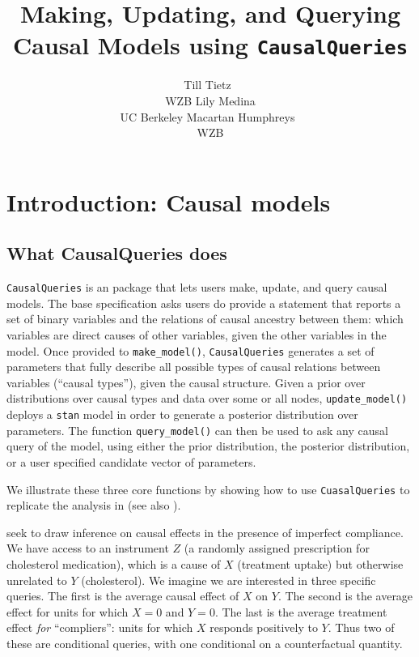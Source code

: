 \documentclass[
  article]{jss}
\author{Till Tietz~\orcidlink{0000-0002-2916-9059}\\WZB \And Lily
Medina\\UC Berkeley \AND Macartan
Humphreys~\orcidlink{0000-0001-7029-2326}\\WZB}
\title{Making, Updating, and Querying Causal Models using
\texttt{CausalQueries}}
\begin{document}
\maketitle
\hypertarget{sec-intro}{%
\section{Introduction: Causal models}\label{sec-intro}}

\hypertarget{what-causalqueries-does}{%
\subsection{What CausalQueries does}\label{what-causalqueries-does}}

\texttt{CausalQueries} is an  package that lets users make,
update, and query causal models. The base specification asks users do
provide a statement that reports a set of binary variables and the
relations of causal ancestry between them: which variables are direct
causes of other variables, given the other variables in the model. Once
provided to \texttt{make\_model()}, \texttt{CausalQueries} generates a
set of parameters that fully describe all possible types of causal
relations between variables (``causal types''), given the causal
structure. Given a prior over distributions over causal types and data
over some or all nodes, \texttt{update\_model()} deploys a \texttt{stan}
model in order to generate a posterior distribution over parameters. The
function \texttt{query\_model()} can then be used to ask any causal
query of the model, using either the prior distribution, the posterior
distribution, or a user specified candidate vector of parameters.

We illustrate these three core functions by showing how to use
\texttt{CuasalQueries} to replicate the analysis in
\citet{chickering1996clinician} (see also \citet{ii2023}).

\citet{chickering1996clinician} seek to draw inference on causal effects
in the presence of imperfect compliance. We have access to an instrument
\(Z\) (a randomly assigned prescription for cholesterol medication),
which is a cause of \(X\) (treatment uptake) but otherwise unrelated to
\(Y\) (cholesterol). We imagine we are interested in three specific
queries. The first is the average causal effect of \(X\) on \(Y\). The
second is the average effect for units for which \(X=0\) and \(Y=0\).
The last is the average treatment effect \emph{for} ``compliers'': units
for which \(X\) responds positively to \(Y\). Thus two of these are
conditional queries, with one conditional on a counterfactual quantity.
\end{document}
